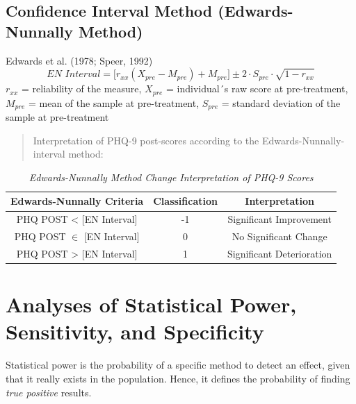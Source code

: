 \documentclass[12pt,twoside]{reedthesis}
\begin{document}
\hypertarget{confidence-interval-method-edwards-nunnally-method}{%
\subsection{Confidence Interval Method (Edwards-Nunnally Method)}\label{confidence-interval-method-edwards-nunnally-method}}

Edwards et al. (1978; Speer, 1992)
\begin{equation}
\textit{EN Interval} = \bigl[ r_{xx} (X_{pre} - M_{pre}) + M_{pre} \bigr] \pm 2 \cdot S_{pre} \cdot \sqrt{1 - r_{xx}} \label{eq:en}
\end{equation}
\(r_{xx}\) = reliability of the measure,
\(X_{pre}\) = individual´s raw score at pre-treatment,
\(M_{pre}\) = mean of the sample at pre-treatment,
\(S_{pre}\) = standard deviation of the sample at pre-treatment
\begin{quote}
Interpretation of PHQ-9 post-scores according to the Edwards-Nunnally-interval method:
\end{quote}
\par
\begin{table}[htb]
\vspace*{1.5em}
\begin{threeparttable}
  \caption{\textit{Edwards-Nunnally Method Change Interpretation of PHQ-9 Scores}}
  \label{tab:en-int}
  \begin{tabular}{@{}ccc@{}}
  \toprule
  Edwards-Nunnally Criteria & Classification & Interpretation\\ \midrule
  PHQ POST < [EN Interval] & -1 & Significant Improvement\\
  PHQ POST $\in$ [EN Interval] & 0 & No Significant Change\\
  PHQ POST > [EN Interval] & 1 & Significant Deterioration\\
  \bottomrule
  \end{tabular}
\end{threeparttable}
\end{table}
\hypertarget{analyses-of-statistical-power-sensitivity-and-specificity}{%
\section{Analyses of Statistical Power, Sensitivity, and Specificity}\label{analyses-of-statistical-power-sensitivity-and-specificity}}

Statistical power is the probability of a specific method to detect an effect, given that it really exists in the population. Hence, it defines the probability of finding \emph{true positive} results.
\end{document}
